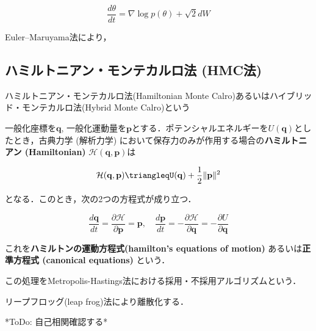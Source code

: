 \begin{equation}
{\frac{d\theta}{dt}}=\nabla \log p (\theta)+{\sqrt 2}{d{W}}
\end{equation}


Euler–Maruyama法により，





\subsection{ハミルトニアン・モンテカルロ法 (HMC法)}
ハミルトニアン・モンテカルロ法(Hamiltonian Monte Calro)あるいはハイブリッド・モンテカルロ法(Hybrid Monte Calro)という

一般化座標を$\mathbf{q}$, 一般化運動量を$\mathbf{p}$とする．ポテンシャルエネルギーを$U(\mathbf{q})$としたとき，古典力学 (解析力学) において保存力のみが作用する場合の\textbf{ハミルトニアン (Hamiltonian)} $\mathcal{H}(\mathbf{q}, \mathbf{p})$は


\begin{equation}
\mathcal{H}(\mathbf{q}, \mathbf{p})\triangleqU(\mathbf{q})+\frac{1}{2}\|\mathbf{p}\|^2
\end{equation}


となる．このとき，次の2つの方程式が成り立つ．


\begin{equation}
\frac{d\mathbf{q}}{dt}=\frac{\partial \mathcal{H}}{\partial \mathbf{p}}=\mathbf{p},\quad\frac{d\mathbf{p}}{dt}=-\frac{\partial \mathcal{H}}{\partial \mathbf{q}}=-\frac{\partial U}{\partial \mathbf{q}}
\end{equation}


これを\textbf{ハミルトンの運動方程式(hamilton's equations of motion)} あるいは\textbf{正準方程式 (canonical equations)} という．


この処理をMetropolis-Hastings法における採用・不採用アルゴリズムという．

リープフロッグ(leap frog)法により離散化する．






*ToDo: 自己相関確認する*
